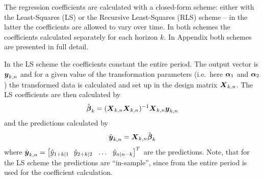 The regression coefficients are calculated with a closed-form scheme: either
with the Least-Squares (LS) or the Recursive Least-Squares (RLS) scheme -- in
the latter the coefficients are allowed to vary over time. In both schemes the
coefficients  calculated separately for each horizon
$k$. In Appendix  both schemes are presented in full detail.

In the LS scheme the coefficients  constant  the entire period. The output
vector is $\mbox{\boldmath{$y$}}_{k,n}$ and for a given value of the transformation parameters
(i.e.\ here $\mbox{\boldmath{$\alpha$}}_{\mathrm{1}}$ and $\mbox{\boldmath{$\alpha$}}_{\mathrm{2}}$) the transformed data is
calculated and set up in the design matrix $\mbox{\boldmath{$X$}}_{k,n}$. The LS coefficients
are then calculated by
\begin{align}
  \hat{\mbox{\boldmath{$\beta$}}}_{k} = (\mbox{\boldmath{$X$}}_{k,n}\mbox{\boldmath{$X$}}_{k,n})^{-1} \mbox{\boldmath{$X$}}_{k,n}\mbox{\boldmath{$y$}}_{k,n}
\end{align}
and the predictions calculated by
\begin{align}
  \hat{\mbox{\boldmath{$y$}}}_{k,n} = \mbox{\boldmath{$X$}}_{k,n} \hat{\mbox{\boldmath{$\beta$}}}_{k}
\end{align}
where $\hat{\mbox{\boldmath{$y$}}}_{k,n} = \left[ \hat{y}_{1+k|1} ~~
    \hat{y}_{2+k|2} ~~ \dots ~~ \hat{y}_{n|n-k}\right]^T$ are the
predictions. Note, that for the LS scheme the predictions are ``in-sample'',
since  from the entire period is used for the coefficient calculation.

